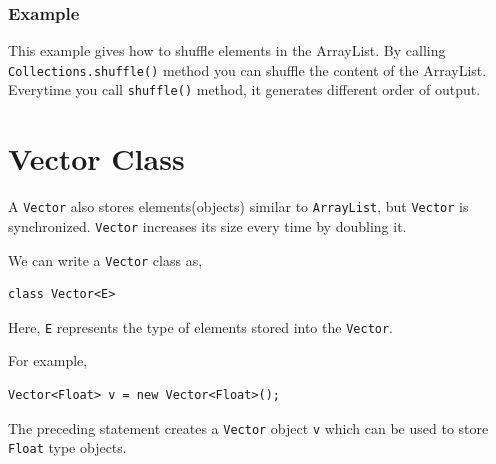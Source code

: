 \documentclass[11pt,a4paper]{article}
\begin{document}
\subsubsection*{Example}
This example gives how to shuffle elements in the ArrayList. By calling \texttt{Collections.shuffle()} method you can shuffle the content of the ArrayList. Everytime you call \texttt{shuffle()} method, it generates different order of output.



\section*{Vector Class}
A \texttt{Vector} also stores elements(objects) similar to \texttt{ArrayList}, but \texttt{Vector} is synchronized. \texttt{Vector} increases its size every time by doubling it.

We can write a \texttt{Vector} class as,
\begin{lstlisting}[numbers=none]
    class Vector<E>
\end{lstlisting}
Here, \texttt{E} represents the type of elements stored into  the \texttt{Vector}.

For example,
\begin{lstlisting}[numbers=none]
    Vector<Float> v = new Vector<Float>();
\end{lstlisting}
The preceding statement creates a \texttt{Vector} object \texttt{v} which can be used to store \texttt{Float} type objects.
\end{document}

